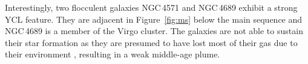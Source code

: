 Interestingly, two flocculent galaxies NGC\,4571 \citep{kennicutt_evolution_1983} and NGC\,4689 \citep{elmegreen_arm_2002} exhibit a strong YCL feature. They are adjacent in Figure~\ref{fig:ms} below the main sequence and NGC\,4689 is a member of the Virgo cluster. The galaxies are not able to sustain their star formation as they are presumed to have lost most of their gas due to their environment \citep{kenney_co_1986}, resulting in a weak middle-age plume. %



